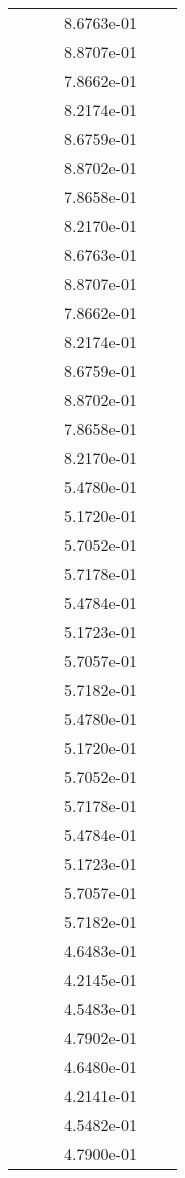 \begin{xltabular}{\textwidth}{r|rS[table-format=1.3e+2]S[table-format=1.4e+2]S[table-format=1.4e+2]S[table-format=-1.5]}
&  &  & 8.6763e-01 & & \\
&  &  & 8.8707e-01 & & \\
&  &  & 7.8662e-01 & & \\
&  &  & 8.2174e-01 & & \\
&  &  & 8.6759e-01 & & \\
&  &  & 8.8702e-01 & & \\
&  &  & 7.8658e-01 & & \\
&  &  & 8.2170e-01 & & \\
&  &  & 8.6763e-01 & & \\
&  &  & 8.8707e-01 & & \\
&  &  & 7.8662e-01 & & \\
&  &  & 8.2174e-01 & & \\
&  &  & 8.6759e-01 & & \\
&  &  & 8.8702e-01 & & \\
&  &  & 7.8658e-01 & & \\
&  &  & 8.2170e-01 & & \\
&  &  & 5.4780e-01 & & \\
&  &  & 5.1720e-01 & & \\
&  &  & 5.7052e-01 & & \\
&  &  & 5.7178e-01 & & \\
&  &  & 5.4784e-01 & & \\
&  &  & 5.1723e-01 & & \\
&  &  & 5.7057e-01 & & \\
&  &  & 5.7182e-01 & & \\
&  &  & 5.4780e-01 & & \\
&  &  & 5.1720e-01 & & \\
&  &  & 5.7052e-01 & & \\
&  &  & 5.7178e-01 & & \\
&  &  & 5.4784e-01 & & \\
&  &  & 5.1723e-01 & & \\
&  &  & 5.7057e-01 & & \\
&  &  & 5.7182e-01 & & \\
&  &  & 4.6483e-01 & & \\
&  &  & 4.2145e-01 & & \\
&  &  & 4.5483e-01 & & \\
&  &  & 4.7902e-01 & & \\
&  &  & 4.6480e-01 & & \\
&  &  & 4.2141e-01 & & \\
&  &  & 4.5482e-01 & & \\
&  &  & 4.7900e-01 & & \\

\end{xltabular}
